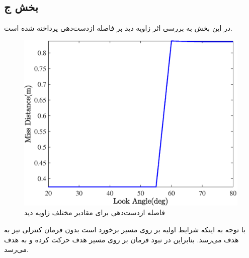 \subsection{بخش ج}
در این بخش به بررسی اثر زاویه دید بر فاصله‌ ازدست‌دهی پرداخته شده است.
\begin{figure}[H]
	\centering
	\includegraphics[width=.75\linewidth]{../Figure/Q1/f/MD}
	\caption{فاصله ازدست‌دهی برای مقادیر مختلف زاویه دید}
\end{figure}

با توجه به اینکه شرایط اولیه بر روی مسیر برخورد است بدون فرمان کنترلی نیز به هدف می‌رسد. بنابراین در نبود فرمان بر روی مسیر هدف حرکت کرده و به هدف می‌رسد.
